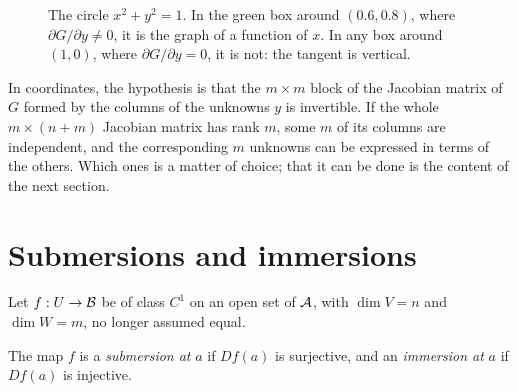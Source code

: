 \begin{notechapter}
\begin{figure}[ht]
\centering
{}
\caption{The circle $x^2 + y^2 = 1$. In the green box around
$(0.6, 0.8)$, where $\partial G/\partial y\neq0$, it is the graph of a
function of $x$. In any box around $(1, 0)$, where
$\partial G/\partial y = 0$, it is not: the tangent is vertical.}
\label{inverse-implicit:fig:circle}
\end{figure}

In coordinates, the hypothesis is that the $m\times m$ block of the
Jacobian matrix of $G$ formed by the columns of the unknowns $y$ is
invertible. If the whole $m\times(n + m)$ Jacobian matrix has rank $m$,
some $m$ of its columns are independent, and the corresponding $m$
unknowns can be expressed in terms of the others. Which ones is a matter
of choice; that it can be done is the content of the next section.

\section{Submersions and immersions}\label{inverse-implicit:sec:rank}

Let $f:U\to\mathcal{B}$ be of class $C^1$ on an open set of $\mathcal{A}$, with
$\dim V = n$ and $\dim W = m$, no longer assumed equal.

\begin{definition}\label{inverse-implicit:def:sub-imm}
The map $f$ is a \emph{submersion at} $a$ if $Df(a)$ is surjective, and
an \emph{immersion at} $a$ if $Df(a)$ is injective.
\end{definition}


\end{notechapter}
